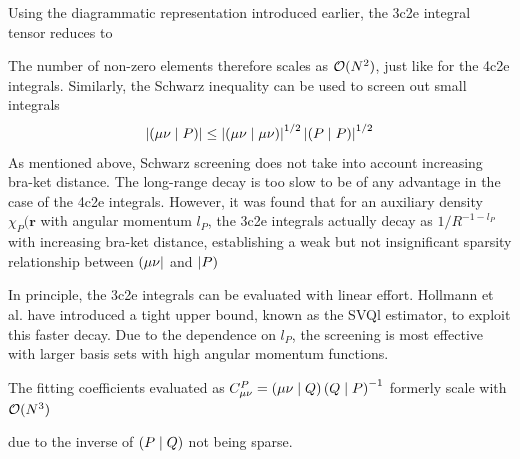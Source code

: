 Using the diagrammatic representation introduced earlier, the 3c2e integral tensor reduces to
\begin{center}
\end{center}
The number of non-zero elements therefore scales as $\mathcal{O}(N^{2})$, just like for the 4c2e integrals. Similarly, the Schwarz inequality can be used to screen out small integrals
\begin{equation}
\left\lvert \left( \mu\nu \mid P \right) \right\rvert \leq \left\lvert \left( \mu\nu \mid \mu\nu \right) \right\rvert^{1/2} \left\lvert \left( P \mid P \right) \right\rvert^{1/2}
\end{equation}
\noindent As mentioned above, Schwarz screening does not take into account increasing bra-ket distance. The long-range decay is too slow to be of any advantage in the case of the 4c2e integrals. However, it was found \cite{Hol2015} that for an auxiliary density $\chi_P(\mathbf{r}$ with angular momentum $l_P$, the 3c2e integrals actually decay as $1/R^{-1 - l_P}$ with increasing bra-ket distance, establishing a weak but not insignificant sparsity relationship between $\left( \mu\nu \right\rvert$ and $\left\lvert P \right)$ 
\begin{center}
\end{center}
\noindent In principle, the 3c2e integrals can be evaluated with linear effort. Hollmann et al. \cite{Hol2015} have introduced a tight upper bound, known as the SVQl estimator, to exploit this faster decay. Due to the dependence on $l_P$, the screening is most effective with larger basis sets with high angular momentum functions.

The fitting coefficients evaluated as $C^P_{\mu\nu} = \left( \mu\nu \mid Q \right) \left( Q \mid P \right)^{-1}$ formerly scale with $\mathcal{O}(N^{3})$
\begin{center}
\end{center}
\noindent due to the inverse of $\left( P \mid Q \right)$ not being sparse. 


